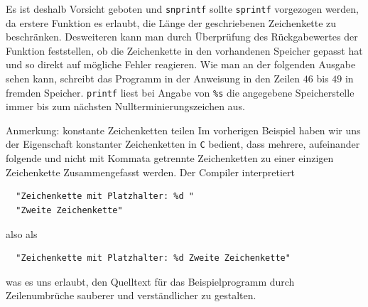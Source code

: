 Es ist deshalb Vorsicht geboten und \texttt{snprintf} sollte \texttt{sprintf} vorgezogen werden, da erstere Funktion es erlaubt, die Länge der geschriebenen Zeichenkette zu beschränken.
Desweiteren kann man durch Überprüfung des Rückgabewertes der Funktion feststellen, ob die Zeichenkette in den vorhandenen Speicher gepasst hat und so direkt auf mögliche Fehler reagieren.
Wie man an der folgenden Ausgabe sehen kann, schreibt das Programm in der Anweisung in den Zeilen $46$ bis $49$ in fremden Speicher.
\texttt{printf} liest bei Angabe von \texttt{\%s} die angegebene Speicherstelle immer bis zum nächsten Nullterminierungszeichen aus.

\begin{myalertblock}{Anmerkung: konstante Zeichenketten teilen}
Im vorherigen Beispiel haben wir uns der Eigenschaft konstanter Zeichenketten in \texttt{C} bedient, dass mehrere, aufeinander folgende und nicht mit Kommata getrennte Zeichenketten zu einer einzigen Zeichenkette Zusammengefasst werden.
Der Compiler interpretiert
\begin{lstlisting}
  "Zeichenkette mit Platzhalter: %d "
  "Zweite Zeichenkette"
\end{lstlisting}
also als
\begin{lstlisting}
  "Zeichenkette mit Platzhalter: %d Zweite Zeichenkette"
\end{lstlisting}
was es uns erlaubt, den Quelltext für das Beispielprogramm durch Zeilenumbrüche sauberer und verständlicher zu gestalten.
\end{myalertblock}

\endinput
